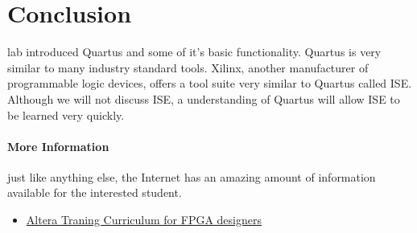 \documentclass[12pt,journal]{IEEEtran}
\begin{document}
  \section{Conclusion}
     lab introduced Quartus and some of it's basic functionality. Quartus is very similar to many industry standard tools. Xilinx, another manufacturer of programmable logic devices, offers a tool suite very similar to Quartus called ISE. Although we will not discuss ISE, a understanding of Quartus will allow ISE to be learned very quickly.
    
    \paragraph{More Information} just like anything else, the Internet has an amazing amount of information available
    for the interested student. 
      \begin{itemize}
        \item \href{http://www.altera.com/education/training/curriculum/fpga/trn-fpga.html}{Altera Traning Curriculum for FPGA designers}
      \end{itemize}

  
  
\end{document}
